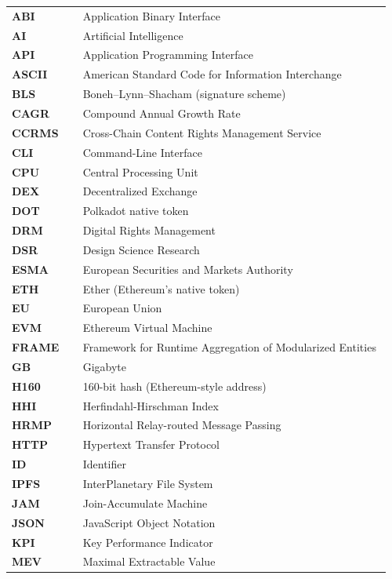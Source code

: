 \begin{longtable}{@{}L{0.18\linewidth} L{0.78\linewidth}@{}}
\textbf{ABI} & Application Binary Interface \\
\textbf{AI} & Artificial Intelligence \\
\textbf{API} & Application Programming Interface \\
\textbf{ASCII} & American Standard Code for Information Interchange \\
\textbf{BLS} & Boneh--Lynn--Shacham (signature scheme) \\
\textbf{CAGR} & Compound Annual Growth Rate \\
\textbf{CCRMS} & Cross-Chain Content Rights Management Service \\
\textbf{CLI} & Command-Line Interface \\
\textbf{CPU} & Central Processing Unit \\
\textbf{DEX} & Decentralized Exchange \\
\textbf{DOT} & Polkadot native token \\
\textbf{DRM} & Digital Rights Management \\
\textbf{DSR} & Design Science Research \\
\textbf{ESMA} & European Securities and Markets Authority \\
\textbf{ETH} & Ether (Ethereum's native token) \\
\textbf{EU} & European Union \\
\textbf{EVM} & Ethereum Virtual Machine \\
\textbf{FRAME} & Framework for Runtime Aggregation of Modularized Entities \\
\textbf{GB} & Gigabyte \\
\textbf{H160} & 160-bit hash (Ethereum-style address) \\
\textbf{HHI} & Herfindahl-Hirschman Index \\
\textbf{HRMP} & Horizontal Relay-routed Message Passing \\
\textbf{HTTP} & Hypertext Transfer Protocol \\
\textbf{ID} & Identifier \\
\textbf{IPFS} & InterPlanetary File System \\
\textbf{JAM} & Join-Accumulate Machine \\
\textbf{JSON} & JavaScript Object Notation \\
\textbf{KPI} & Key Performance Indicator \\
\textbf{MEV} & Maximal Extractable Value \\

\end{longtable}
